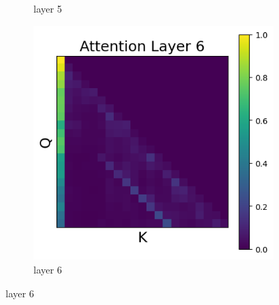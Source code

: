 \documentclass[11pt]{article}
\begin{document}
\begin{figure}[t]
\begin{subfigure}[t]{0.24\textwidth}
    \caption{layer 5}
  \end{subfigure}\hfill
  \begin{subfigure}[t]{0.24\textwidth}
    \centering
    \includegraphics[width=1.4\columnwidth]{figures/no_intervention/layer_6.png}
    \caption{layer 6}
  \end{subfigure}\hfill


\end{figure}
\end{document}
